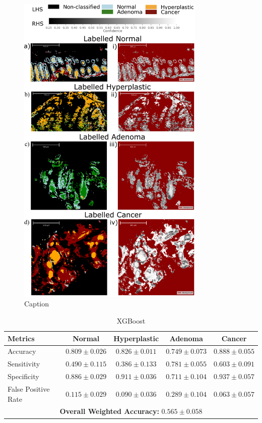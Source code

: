 \begin{figure}[htbp] 
    \centering 
    \includegraphics[width=0.8\textwidth]{Images/Confidence.png} 
    \caption{Caption} \label{fig:my-label}
\end{figure}

\begin{table}[ht] \centering \caption{XGBoost} \label{tab:xgboost}
\begin{tabular}{lcccc} \toprule Metrics & Normal & Hyperplastic & Adenoma & Cancer \\ \midrule Accuracy & $0.809\pm0.026$ & $0.826\pm0.011$ & $0.749\pm0.073$ & $0.888\pm0.055$ \\ Sensitivity & $0.490\pm0.115$ & $0.386\pm0.133$ & $0.781\pm0.055$ & $0.603\pm0.091$ \\
Specificity & $0.886\pm0.029$ & $0.911\pm0.036$ & $0.711\pm0.104$ & $0.937\pm0.057$ \\ False Positive Rate & $0.115\pm0.029$ & $0.090\pm0.036$ & $0.289\pm0.104$ & $0.063\pm0.057$ \\ \midrule \multicolumn{5}{c}{\textbf{Overall Weighted Accuracy:}
$0.565\pm0.058$} \\ \bottomrule \end{tabular} \end{table}

